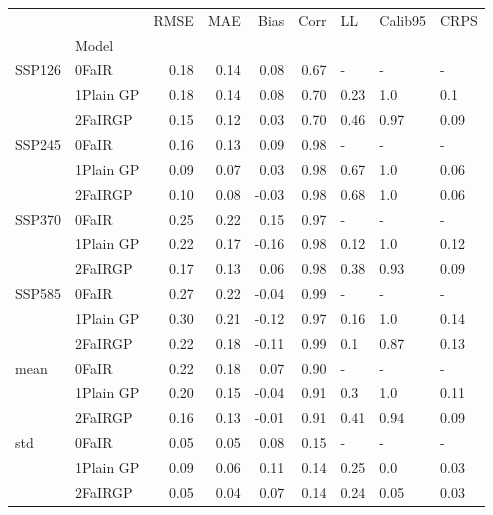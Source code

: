 \begin{tabular}{llrrrrlll}
\toprule
    &         &  RMSE &   MAE &  Bias &  Corr &    LL & Calib95 &  CRPS \\
{} & Model &       &       &       &       &       &         &       \\
\midrule
SSP126 & 0FaIR &  0.18 &  0.14 &  0.08 &  0.67 &     - &       - &     - \\
    & 1Plain GP &  0.18 &  0.14 &  0.08 &  0.70 &  0.23 &     1.0 &   0.1 \\
    & 2FaIRGP &  0.15 &  0.12 &  0.03 &  0.70 &  0.46 &    0.97 &  0.09 \\
SSP245 & 0FaIR &  0.16 &  0.13 &  0.09 &  0.98 &     - &       - &     - \\
    & 1Plain GP &  0.09 &  0.07 &  0.03 &  0.98 &  0.67 &     1.0 &  0.06 \\
    & 2FaIRGP &  0.10 &  0.08 & -0.03 &  0.98 &  0.68 &     1.0 &  0.06 \\
SSP370 & 0FaIR &  0.25 &  0.22 &  0.15 &  0.97 &     - &       - &     - \\
    & 1Plain GP &  0.22 &  0.17 & -0.16 &  0.98 &  0.12 &     1.0 &  0.12 \\
    & 2FaIRGP &  0.17 &  0.13 &  0.06 &  0.98 &  0.38 &    0.93 &  0.09 \\
SSP585 & 0FaIR &  0.27 &  0.22 & -0.04 &  0.99 &     - &       - &     - \\
    & 1Plain GP &  0.30 &  0.21 & -0.12 &  0.97 &  0.16 &     1.0 &  0.14 \\
    & 2FaIRGP &  0.22 &  0.18 & -0.11 &  0.99 &   0.1 &    0.87 &  0.13 \\
mean & 0FaIR &  0.22 &  0.18 &  0.07 &  0.90 &     - &       - &     - \\
    & 1Plain GP &  0.20 &  0.15 & -0.04 &  0.91 &   0.3 &     1.0 &  0.11 \\
    & 2FaIRGP &  0.16 &  0.13 & -0.01 &  0.91 &  0.41 &    0.94 &  0.09 \\
std & 0FaIR &  0.05 &  0.05 &  0.08 &  0.15 &     - &       - &     - \\
    & 1Plain GP &  0.09 &  0.06 &  0.11 &  0.14 &  0.25 &     0.0 &  0.03 \\
    & 2FaIRGP &  0.05 &  0.04 &  0.07 &  0.14 &  0.24 &    0.05 &  0.03 \\
\bottomrule
\end{tabular}
